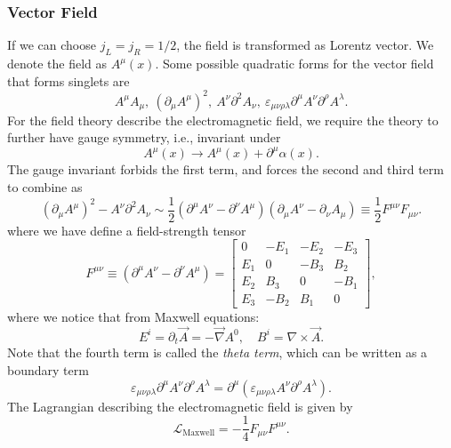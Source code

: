 \subsubsection{Vector Field}
If we can choose $j_L=j_R=1/2$, the field is transformed as Lorentz vector.
We denote the field as $A^\mu(x)$.
Some possible quadratic forms for the vector field that forms singlets are
\begin{equation}
	A^\mu A_\mu,\ (\partial_\mu A^\mu)^2,\ A^\nu \partial^2 A_\nu,\ 
	\varepsilon_{\mu\nu\rho\lambda} \partial^\mu A^\nu \partial^\rho A^\lambda.
\end{equation}
For the field theory describe the electromagnetic field, we require the theory to further have gauge symmetry, i.e., invariant under
\begin{equation}
	A^\mu(x) \rightarrow A^\mu(x) + \partial^\mu \alpha(x).
\end{equation}
The gauge invariant forbids the first term, and forces the second and third term to combine as
\begin{equation*}
	(\partial_\mu A^\mu)^2 - A^\nu \partial^2 A_\nu
	\sim \frac{1}{2}(\partial^\mu A^\nu - \partial^\nu A^\mu)(\partial_\mu A^\nu-\partial_\nu A_\mu)
	\equiv \frac{1}{2} F^{\mu\nu}F_{\mu\nu}.
\end{equation*}
where we have define a field-strength tensor
\begin{equation}
	F^{\mu\nu}\equiv (\partial^\mu A^\nu - \partial^\nu A^\mu)
	= \left[\begin{array}{cccc}
		0 & -E_1 & -E_2 & -E_3 \\
		E_1 & 0 & -B_3 & B_2 \\
		E_2 & B_3 & 0 & -B_1 \\
		E_3 & -B_2 & B_1 & 0
	\end{array} \right],
\end{equation}
where we notice that from Maxwell equations:
\begin{equation}
	E^i = \partial_t \vec A = -\vec\nabla A^0, \quad B^i = \nabla \times \vec A.
\end{equation}
Note that the fourth term is called the \textit{theta term}, which can be written as a boundary term
\begin{equation}
	\varepsilon_{\mu\nu\rho\lambda} \partial^\mu A^\nu \partial^\rho A^\lambda
	= \partial^\mu (\varepsilon_{\mu\nu\rho\lambda} A^\nu \partial^\rho A^\lambda).
\end{equation}
The Lagrangian describing the electromagnetic field is given by
\begin{equation}
	\mathcal{L}_{\mathrm{Maxwell}} = -\frac{1}{4}F_{\mu\nu}F^{\mu\nu}.
\end{equation}


